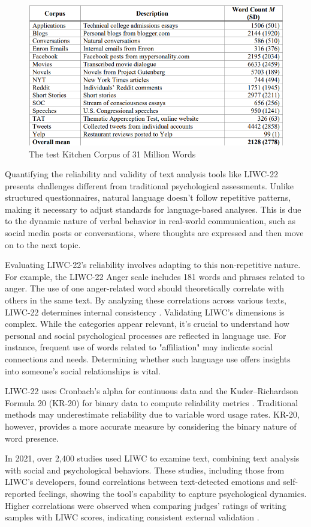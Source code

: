 \begin{figure}[htbp]
	\centering
		\includegraphics[scale=0.65]{./figures/test-kitchen-corpus.png}
	\caption{The test Kitchen Corpus of 31 Million Words \cite{boyd2022development}}
	\label{FigKitchenCorpus}
\end{figure}

Quantifying the reliability and validity of text analysis tools like LIWC-22 presents challenges different from traditional psychological assessments. Unlike structured questionnaires, natural language doesn't follow repetitive patterns, making it necessary to adjust standards for language-based analyses. This is due to the dynamic nature of verbal behavior in real-world communication, such as social media posts or conversations, where thoughts are expressed and then move on to the next topic.

Evaluating LIWC-22's reliability involves adapting to this non-repetitive nature. For example, the LIWC-22 Anger scale includes 181 words and phrases related to anger. The use of one anger-related word should theoretically correlate with others in the same text. By analyzing these correlations across various texts, LIWC-22 determines internal consistency \cite{boyd2022development}. Validating LIWC's dimensions is complex. While the categories appear relevant, it's crucial to understand how personal and social psychological processes are reflected in language use. For instance, frequent use of words related to "affiliation" may indicate social connections and needs. Determining whether such language use offers insights into someone's social relationships is vital.

LIWC-22 uses Cronbach’s alpha for continuous data and the Kuder–Richardson Formula 20 (KR-20) for binary data to compute reliability metrics \cite{kuder1937theory}. Traditional methods may underestimate reliability due to variable word usage rates. KR-20, however, provides a more accurate measure by considering the binary nature of word presence.

In 2021, over 2,400 studies used LIWC to examine text, combining text analysis with social and psychological behaviors. These studies, including those from LIWC's developers, found correlations between text-detected emotions and self-reported feelings, showing the tool's capability to capture psychological dynamics. Higher correlations were observed when comparing judges' ratings of writing samples with LIWC scores, indicating consistent external validation \cite{boyd2022development}.